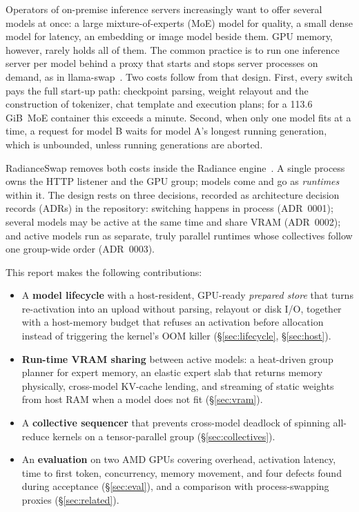 \documentclass[10pt,conference,a4paper]{IEEEtran}
\newcommand{\GiB}{\,GiB}
\begin{document}
Operators of on-premise inference servers increasingly want to offer several models at once: a
large mixture-of-experts (MoE) model for quality, a small dense model for latency, an embedding or
image model beside them. GPU memory, however, rarely holds all of them. The common practice is to
run one inference server per model behind a proxy that starts and stops server processes on demand,
as in llama-swap~\cite{llamaswap}. Two costs follow from that design. First, every switch pays the
full start-up path: checkpoint parsing, weight relayout and the construction of tokenizer, chat
template and execution plans; for a 113.6\GiB\ MoE container this exceeds a minute. Second, when
only one model fits at a time, a request for model B waits for model A's longest running
generation, which is unbounded, unless running generations are aborted.

RadianceSwap removes both costs inside the Radiance engine~\cite{radiance}. A single process owns
the HTTP listener and the GPU group; models come and go as \emph{runtimes} within it. The design
rests on three decisions, recorded as architecture decision records (ADRs) in the repository:
switching happens in process (ADR~0001); several models may be active at the same time and share
VRAM (ADR~0002); and active models run as separate, truly parallel runtimes whose collectives
follow one group-wide order (ADR~0003).

This report makes the following contributions:
\begin{itemize}
  \item A \textbf{model lifecycle} with a host-resident, GPU-ready \emph{prepared store} that turns
        re-activation into an upload without parsing, relayout or disk I/O, together with a
        host-memory budget that refuses an activation before allocation instead of triggering the
        kernel's OOM killer (\S\ref{sec:lifecycle}, \S\ref{sec:host}).
  \item \textbf{Run-time VRAM sharing} between active models: a heat-driven group planner for
        expert memory, an elastic expert slab that returns memory physically, cross-model KV-cache
        lending, and streaming of static weights from host RAM when a model does not fit
        (\S\ref{sec:vram}).
  \item A \textbf{collective sequencer} that prevents cross-model deadlock of spinning all-reduce
        kernels on a tensor-parallel group (\S\ref{sec:collectives}).
  \item An \textbf{evaluation} on two AMD GPUs covering overhead, activation latency, time to first
        token, concurrency, memory movement, and four defects found during acceptance
        (\S\ref{sec:eval}), and a comparison with process-swapping proxies (\S\ref{sec:related}).
\end{itemize}
\end{document}
